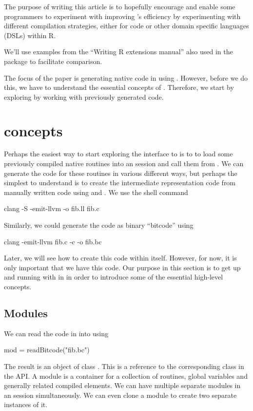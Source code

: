 \documentclass[article]{jss}
\def\IR{intermediate representation}
\begin{document}
The purpose of writing this article is to hopefully encourage and
enable some \R{} programmers to experiment with improving \R's
efficiency by experimenting with different compilation strategies,
either for \R{} code or other domain specific languages (DSLs) within
R.

We'll use examples from the ``Writing R extensions manual'' also used
in the ~\cite{bib:Rcpp} package to facilitate comparison.


The focus of the paper is generating native code in \R{} using \llvm.
However, before we do this, we have to understand the essential
concepts of \llvm.  Therefore, we start by exploring \llvm{} by
working with previously generated code. %


\section[LLVM Concepts]{\llvm concepts}

Perhaps the easiest way to start exploring the \R{} interface to
\llvm{} is to to load some previously compiled native routines into an
\R{} session and call them from \R. 
We can generate the code for these routines in various different ways,
but perhaps the simplest to understand is to create the \IR{} code
from manually written \C{} code using \clang{} and
. We use the shell command
\begin{ShCode}
clang -S -emit-llvm -o fib.ll fib.c
\end{ShCode}
Similarly, we could generate the code as binary ``bitcode''
using
\begin{ShCode}
clang  -emit-llvm fib.c -c -o fib.bc
\end{ShCode}
Later, we will see how to create this code within \R{} itself.
However, for now, it is  only important that we have this code.
Our purpose in this section is to get up and running with \llvm{}
in \R{} in order to introduce some of the essential high-level concepts.


\subsection{Modules}
We can read the code in  into \R{} using
\begin{RCode}
mod = readBitcode("fib.bc")  
\end{RCode}
The result is an object of class .  This is a reference
to the corresponding \Cpp{} class in the \llvm{} API.  A module is a
container for a collection of routines, global variables and generally
related compiled elements.  We can have multiple separate modules in
an \R{} session simultaneously.  We can even clone a module to create
two separate instances of it.
\end{document}
